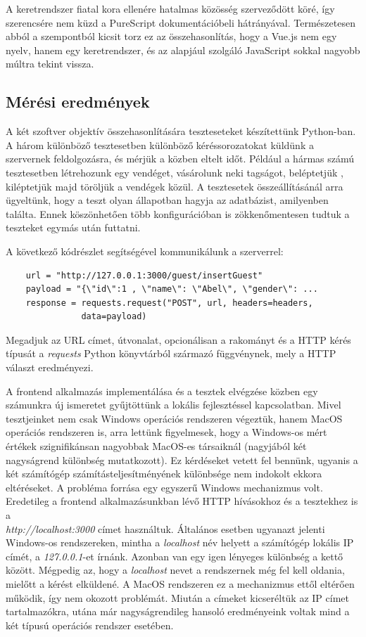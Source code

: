 \documentclass[12pt]{article}
\begin{document}
A keretrendszer fiatal kora ellenére hatalmas közösség szerveződött köré, így szerencsére nem küzd a PureScript dokumentációbeli hátrányával. Természetesen abból a szempontból kicsit torz ez az összehasonlítás, hogy a Vue.js nem egy nyelv, hanem egy keretrendszer, és az alapjául szolgáló JavaScript sokkal nagyobb múltra tekint vissza.

\subsection{Mérési eredmények}

A két szoftver objektív összehasonlítására teszteseteket készítettünk Python-ban. A három különböző tesztesetben különböző kéréssorozatokat küldünk a szervernek feldolgozásra, és mérjük a közben eltelt időt. Például a hármas számú tesztesetben létrehozunk egy vendéget,  vásárolunk neki tagságot,  beléptetjük , kiléptetjük majd töröljük a vendégek közül.  A tesztesetek összeállításánál arra ügyeltünk, hogy a teszt olyan állapotban hagyja az adatbázist, amilyenben találta. Ennek köszönhetően több konfigurációban is zökkenőmentesen tudtuk a teszteket egymás után futtatni.

A következő kódrészlet segítségével kommunikálunk a szerverrel:
\begin{verbatim}
    url = "http://127.0.0.1:3000/guest/insertGuest"
    payload = "{\"id\":1 , \"name\": \"Abel\", \"gender\": ...
    response = requests.request("POST", url, headers=headers, 
               data=payload)
\end{verbatim}

Megadjuk az URL címet, útvonalat, opcionálisan a rakományt és a HTTP kérés típusát a \textit{requests} Python könyvtárból származó függvénynek, mely a HTTP választ eredményezi.

A frontend alkalmazás implementálása és a tesztek elvégzése közben egy számunkra új ismeretet gyűjtöttünk a lokális fejlesztéssel kapcsolatban. Mivel tesztjeinket nem csak Windows operációs rendszeren végeztük, hanem MacOS operációs rendszeren is, arra lettünk figyelmesek, hogy a Windows-os mért értékek szignifikánsan nagyobbak MacOS-es társaiknál (nagyjából két nagyságrend különbség mutatkozott). Ez kérdéseket vetett fel bennünk, ugyanis a két számítógép számításteljesítményének különbsége nem indokolt ekkora eltéréseket. A probléma forrása egy egyszerű Windows mechanizmus volt. Eredetileg a frontend alkalmazásunkban lévő HTTP hívásokhoz és a tesztekhez is a \\ \textit{http://localhost:3000} címet használtuk. Általános esetben ugyanazt jelenti Windows-os rendszereken, mintha a \textit{localhost} név helyett a számítógép lokális IP címét, a \textit{127.0.0.1}-et írnánk. Azonban van egy igen lényeges különbség a kettő között. Mégpedig az, hogy a \textit{localhost} nevet a rendszernek még fel kell oldania, mielőtt a kérést elküldené. A MacOS rendszeren ez a mechanizmus ettől eltérően működik, így nem okozott problémát. Miután a címeket kicseréltük az IP címet tartalmazókra, utána már nagyságrendileg hansoló eredményeink voltak mind a két típusú operációs rendszer esetében.
\end{document}
